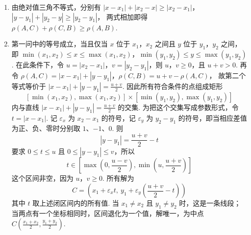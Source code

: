 \begin{solution}
\begin{enumerate}
\item 由绝对值三角不等式，分别有
\(|x-x_1|+|x_2-x|\geqslant|x_2-x_1|\)，\(|y-y_1|+|y_2-y|\geqslant|y_2-y_1|\)，
两式相加即得 \(\rho(A,C)+\rho(C,B)\geqslant\rho(A,B)\).
\item 第一问中的等号成立，当且仅当 \(x\) 位于 \(x_1\)，\(x_2\) 之间且 \(y\) 位于 \(y_1\)，\(y_2\) 之间，即
\(\min(x_1,x_2)\leqslant x\leqslant\max(x_1,x_2)\)，\(\min(y_1,y_2)\leqslant y\leqslant\max(y_1,y_2)\).
在此条件下，令 \(u=|x_2-x_1|\)，\(v=|y_2-y_1|\)，则 \(u\)，\(v\geqslant0\)，且 \(u+v>0\). 再令
\(\rho(A,C)=|x-x_1|+|y-y_1|\)，\(\rho(C,B)=u+v-\rho(A,C)\)，
故第二个等式等价于 \(|x-x_1|+|y-y_1|=\frac{u+v}{2}\). 因此所有符合条件的点组成矩形
\[
[\min(x_1,x_2),\max(x_1,x_2)]\times[\min(y_1,y_2),\max(y_1,y_2)]
\]
内与直线 \(|x-x_1|+|y-y_1|=\frac{u+v}{2}\) 的交集. 为把这个交集写成参数形式，令 \(t=|x-x_1|\). 记 \(\varepsilon_x\) 为 \(x_2-x_1\) 的符号，记 \(\varepsilon_y\) 为 \(y_2-y_1\) 的符号，即当相应差值为正、负、零时分别取 \(1\)、\(-1\)、\(0\). 则
\[
|y-y_1|=\frac{u+v}{2}-t
\]
要求 \(0\leqslant t\leqslant u\) 且 \(0\leqslant |y-y_1|\leqslant v\)，所以
\[
t\in\left[\max\left(0,\frac{u-v}{2}\right),\min\left(u,\frac{u+v}{2}\right)\right]
\]
这个区间非空，因为 \(u\)，\(v\geqslant0\). 所有解为
\[
C=\left(x_1+\varepsilon_x t,\ y_1+\varepsilon_y\left(\frac{u+v}{2}-t\right)\right)
\]
其中 \(t\) 取上述闭区间内的所有值. 当 \(x_1\ne x_2\) 且 \(y_1\ne y_2\) 时，这是一条线段；当两点有一个坐标相同时，区间退化为一个值，解唯一，为中点 \(C\left(\frac{x_1+x_2}{2},\frac{y_1+y_2}{2}\right)\).
\end{enumerate}
\end{solution}
